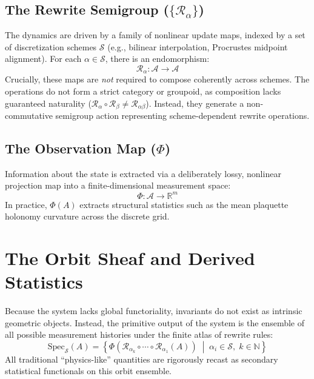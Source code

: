 \documentclass[11pt,a4paper]{article}
\begin{document}
\subsection{The Rewrite Semigroup ($\{\mathcal{R}_\alpha\}$)}
The dynamics are driven by a family of nonlinear update maps, indexed by a set of discretization schemes $\mathcal{S}$ (e.g., bilinear interpolation, Procrustes midpoint alignment). For each $\alpha \in \mathcal{S}$, there is an endomorphism:
\begin{equation}
    \mathcal{R}_\alpha : \mathcal{A} \to \mathcal{A}
\end{equation}
Crucially, these maps are \textit{not} required to compose coherently across schemes. The operations do not form a strict category or groupoid, as composition lacks guaranteed naturality ($\mathcal{R}_\alpha \circ \mathcal{R}_\beta \neq \mathcal{R}_{\alpha\beta}$). Instead, they generate a non-commutative semigroup action representing scheme-dependent rewrite operations.

\subsection{The Observation Map ($\Phi$)}
Information about the state is extracted via a deliberately lossy, nonlinear projection map into a finite-dimensional measurement space:
\begin{equation}
    \Phi : \mathcal{A} \to \mathbb{R}^m
\end{equation}
In practice, $\Phi(A)$ extracts structural statistics such as the mean plaquette holonomy curvature across the discrete grid.

\section{The Orbit Sheaf and Derived Statistics}

Because the system lacks global functoriality, invariants do not exist as intrinsic geometric objects. Instead, the primitive output of the system is the ensemble of all possible measurement histories under the finite atlas of rewrite rules:
\begin{equation}
    \mathrm{Spec}_{\mathcal{S}}(A) = \left\{ \Phi\left(\mathcal{R}_{\alpha_k} \circ \cdots \circ \mathcal{R}_{\alpha_1}(A)\right) \;\middle|\; \alpha_i \in \mathcal{S},\; k \in \mathbb{N} \right\}
\end{equation}
All traditional ``physics-like'' quantities are rigorously recast as secondary statistical functionals on this orbit ensemble.
\end{document}
